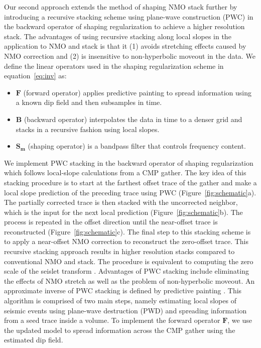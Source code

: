 Our second approach extends the method of shaping NMO stack further by introducing a recursive stacking scheme
using plane-wave construction (PWC) \cite[]{fomel7} in the backward operator of shaping regularization to achieve a higher resolution stack. 
The advantages of using recursive stacking along local slopes in the application to NMO 
and stack is that it (1) avoids stretching effects caused by NMO correction and (2) is insensitive to 
non-hyperbolic moveout in the data. We define the linear operators used in the shaping regularization 
scheme in equation~\ref{eq:inv} as:
\begin{itemize}
\item{$\mathbf{F}$ (forward operator) applies predictive painting \cite[]{fomel6} to spread information using a known dip field 
	and then subsamples in time.}
\item{$\mathbf{B}$ (backward operator) interpolates the data in time to a denser grid and stacks in a recursive fashion using local slopes.}
\item{$\mathbf{S_m}$ (shaping operator) is a bandpass filter that controls frequency content.}
\end{itemize}

We implement PWC stacking in the backward operator of shaping regularization which follows
local-slope calculations from a CMP gather. The key idea of this stacking procedure is
to start at the farthest offset trace of the gather and make a local slope prediction of the preceding trace using 
PWC (Figure~\ref{fig:schematic}a). The partially corrected trace is then stacked with the uncorrected neighbor, 
which is the input for the next local prediction (Figure~\ref{fig:schematic}b). The process is repeated in the 
offset direction until the near-offset trace is reconstructed (Figure~\ref{fig:schematic}c). 
The final step to this stacking scheme is to apply a near-offset NMO correction to reconstruct the zero-offset trace.
This recursive stacking approach results in higher resolution stacks compared 
to conventional NMO and stack. The procedure is equivalent to computing the zero scale of the seislet transform 
\cite[]{fomel3}. Advantages of PWC stacking include eliminating 
the effects of NMO stretch as well as the problem of non-hyperbolic moveout. 
An approximate inverse of PWC stacking is defined by predictive painting \cite[]{fomel6}. 
This algorithm is comprised of two main steps, namely estimating 
local slopes of seismic events using plane-wave destruction (PWD) \cite[]{fomel5} and spreading information from a seed 
trace inside a volume. To implement the forward operator $\mathbf{F}$, we use the updated model to spread information 
across the CMP gather using the estimated dip field.

